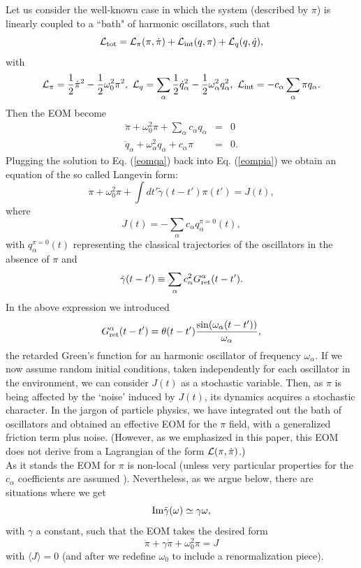 \documentclass[11pt,amsmath,floats,floatfix,nofootinbib,secnumarabic, superscriptaddress, tightenlines]{revtex4}
\newcommand{\beq}{\begin{equation}}
\newcommand{\eeq}{\end{equation}}
\newcommand{\bea}{\begin{eqnarray}}
\newcommand{\eea}{\end{eqnarray}}
\newcommand{\calL}{{\cal L}}
\begin{document}
{Let us consider the well-known case in which the system (described by $\pi$) is linearly coupled to a ``bath" of harmonic oscillators, such that  \cite{weiss,calzetta}
\beq
\label{Ltot}
\calL_{\rm tot} =  \calL_\pi(\pi,\dot\pi) + \calL_{\rm int}(q,\pi) + \calL_q(q,\dot q),
\eeq
with
\beq
\calL_\pi = \frac{1}{2} \dot\pi^2 - \frac{1}{2}\omega_0^2 \pi^2,~ \calL_q = \sum_\alpha \frac{1}{2} \dot q_\alpha^2 - \frac{1}{2}\omega_\alpha^2 q_\alpha^2,~\calL_{\rm int} = -c_\alpha \sum_\alpha \pi q_\alpha.
\eeq
Then the EOM become
\bea
\ddot\pi +\omega_0^2 \pi + \sum_\alpha c_\alpha q_\alpha &=& 0 \label{eompia}\\
\ddot q_\alpha +\omega_\alpha^2 q_\alpha + c_\alpha\pi &=& 0 \label{eomqa}.
\eea
Plugging the solution to Eq. (\ref{eomqa}) back into Eq. (\ref{eompia}) we obtain an equation of the so called Langevin form:
\beq
\label{eom2n}
\ddot\pi +\omega_0^2 \pi +  \int dt' \tilde\gamma(t-t')\pi(t') = J(t),
\eeq
where
\beq
J (t)= -\sum_\alpha c_\alpha q^{\pi=0}_\alpha(t),
\eeq
with $ q^{\pi=0}_\alpha (t)$ representing the classical trajectories of the oscillators  in the absence of $\pi$ and
\beq
\label{gammattp}
\tilde\gamma(t-t') \equiv \sum_\alpha c_\alpha^2 G^\alpha_{\rm ret}(t-t').
\eeq
In the above expression we introduced
\beq
G_{\rm ret}^\alpha(t-t') = \theta(t-t') \frac{\sin(\omega_\alpha(t-t'))}{\omega_\alpha},
\eeq
the retarded Green's function for an harmonic oscillator of frequency $\omega_\alpha$.
If we now assume random initial conditions, taken independently for each oscillator in the environment, we can consider $J(t)$ as a stochastic variable.
Then, as $\pi$ is being affected by the `noise' induced by  $J(t)$,  its dynamics acquires a stochastic character.
In the jargon of particle physics, we have integrated out the bath of oscillators and obtained an effective EOM for the $\pi$ field, with a generalized friction term plus noise. (However, as we emphasized in this paper, this EOM does not derive from a Lagrangian of the form $\calL(\pi,\dot\pi)$.)\\

As it stands the EOM for $\pi$ is non-local (unless very particular properties for the $c_\alpha$ coefficients are assumed \cite{weiss, calzetta}). Nevertheless, as we argue below, there are situations where we get
\beq
\label{imgam2}
{\rm Im} \tilde\gamma(\omega) \simeq  \gamma \omega,
\eeq
with $\gamma$ a constant, such that the EOM takes the desired form
\beq
\label{eom1n}
\ddot\pi + \gamma\dot\pi+ \omega_0^2\pi = J
\eeq
with $\langle J\rangle =0$ (and after we redefine $\omega_0$ to include a renormalization piece).\\

}
\end{document}
